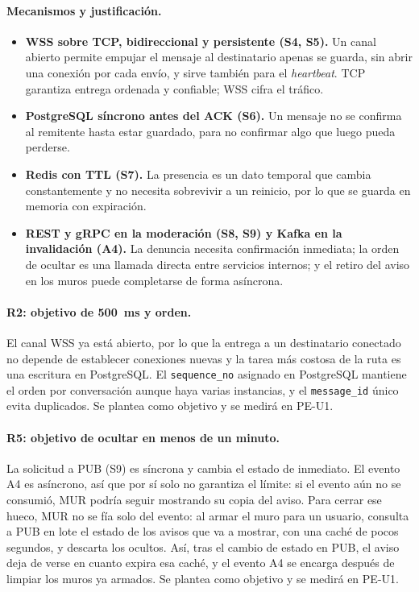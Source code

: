 \paragraph{Mecanismos y justificación.}
\begin{itemize}[leftmargin=*]
  \item \textbf{WSS sobre TCP, bidireccional y persistente (S4, S5).} Un canal abierto
  permite empujar el mensaje al destinatario apenas se guarda, sin abrir una conexión por
  cada envío, y sirve también para el \emph{heartbeat}. TCP garantiza entrega ordenada y
  confiable; WSS cifra el tráfico.
  \item \textbf{PostgreSQL síncrono antes del ACK (S6).} Un mensaje no se confirma al
  remitente hasta estar guardado, para no confirmar algo que luego pueda perderse.
  \item \textbf{Redis con TTL (S7).} La presencia es un dato temporal que cambia
  constantemente y no necesita sobrevivir a un reinicio, por lo que se guarda en memoria con
  expiración.
  \item \textbf{REST y gRPC en la moderación (S8, S9) y Kafka en la invalidación (A4).} La
  denuncia necesita confirmación inmediata; la orden de ocultar es una llamada directa entre
  servicios internos; y el retiro del aviso en los muros puede completarse de forma
  asíncrona.
\end{itemize}

\paragraph{R2: objetivo de 500~ms y orden.}
El canal WSS ya está abierto, por lo que la entrega a un destinatario conectado no depende
de establecer conexiones nuevas y la tarea más costosa de la ruta es una escritura en
PostgreSQL. El \texttt{sequence\_no} asignado en PostgreSQL mantiene el orden por
conversación aunque haya varias instancias, y el \texttt{message\_id} único evita duplicados.
Se plantea como objetivo y se medirá en PE-U1.

\paragraph{R5: objetivo de ocultar en menos de un minuto.}
La solicitud a PUB (S9) es síncrona y cambia el estado de inmediato. El evento A4 es
asíncrono, así que por sí solo no garantiza el límite: si el evento aún no se consumió, MUR
podría seguir mostrando su copia del aviso. Para cerrar ese hueco, MUR no se fía solo del
evento: al armar el muro para un usuario, consulta a PUB en lote el estado de los avisos que
va a mostrar, con una caché de pocos segundos, y descarta los ocultos. Así, tras el cambio de
estado en PUB, el aviso deja de verse en cuanto expira esa caché, y el evento A4 se encarga
después de limpiar los muros ya armados. Se plantea como objetivo y se medirá en PE-U1.

